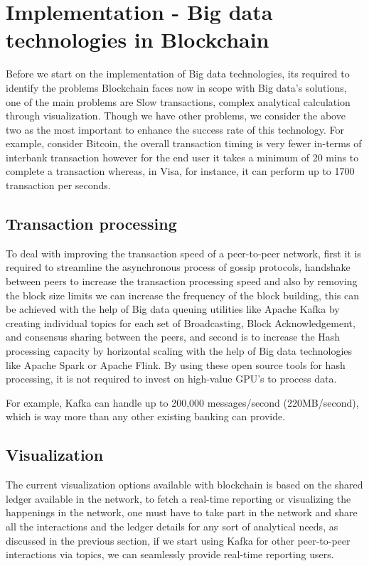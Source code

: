 \documentclass[sigconf]{acmart}
\begin{document}
\section{Implementation - Big data technologies in Blockchain}
Before we start on the implementation of Big data technologies, its required to identify the problems Blockchain faces now in scope with Big data's solutions, one of the main problems are Slow transactions, complex analytical calculation through visualization. Though we have other problems, we consider the above two as the most important to enhance the success rate of this technology.
For example, consider Bitcoin, the overall transaction timing is very fewer in-terms of interbank transaction however for the end user it takes a minimum of 20 mins to complete a transaction whereas, in Visa, for instance, it can perform up to 1700 transaction per seconds.

\subsection{Transaction processing}
To deal with improving the transaction speed of a peer-to-peer network, first it is required to streamline the asynchronous process of gossip protocols, handshake between peers to increase the transaction processing speed and also by removing the block size limits\cite{Optimize-bitcoin} we can increase the frequency of the block building, this can be achieved with the help of Big data queuing utilities like Apache Kafka by creating individual topics for each set of Broadcasting, Block Acknowledgement, and consensus sharing between the peers,   and second is to increase the Hash processing capacity by horizontal scaling with the help of Big data technologies like Apache Spark or Apache Flink. By using these open source tools for hash processing, it is not required to invest on high-value GPU's to process data.

For example, Kafka can handle up to 200,000 messages/second (220MB/second)\cite{kafka_performance}, which is way more than any other existing banking can provide.



\subsection{Visualization}
The current visualization options available with blockchain is based on the shared ledger available in the network, to fetch a real-time reporting or visualizing the happenings in the network, one must have to take part in the network and share all the interactions and the ledger details for any sort of analytical needs, as discussed in the previous section, if we start using Kafka for other peer-to-peer interactions via topics, we can seamlessly provide real-time reporting users.
\end{document}
